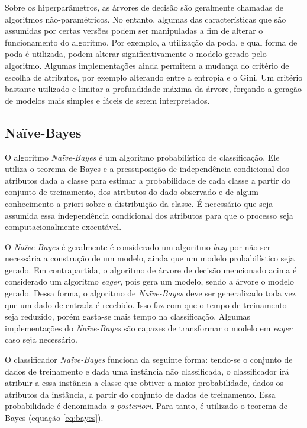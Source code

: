\documentclass{article}
\begin{document}
Sobre os hiperparâmetros, as árvores de decisão são geralmente chamadas de algoritmos não-paramétricos.
No entanto, algumas das características que são assumidas por certas versões podem ser manipuladas
a fim de alterar o funcionamento do algoritmo.
Por exemplo, a utilização da poda, e qual forma de poda é utilizada,
podem alterar significativamente o modelo gerado pelo algoritmo.
Algumas implementações ainda permitem a mudança do critério de escolha de atributos,
por exemplo alterando entre a entropia e o Gini.
Um critério bastante utilizado e limitar a profundidade máxima da árvore,
forçando a geração de modelos mais simples e fáceis de serem interpretados.


\subsection{Naïve-Bayes}

O algoritmo {\it Naïve-Bayes} é um algoritmo probabilístico de classificação.
Ele utiliza o teorema de Bayes e a pressuposição de independência condicional
dos atributos dada a classe para estimar a probabilidade de cada classe a partir do conjunto de treinamento,
dos atributos do dado observado e de algum conhecimento a priori sobre a distribuição da classe.
É necessário que seja assumida essa independência condicional dos atributos para
que o processo seja computacionalmente executável.

O {\it Naïve-Bayes} é geralmente é considerado um algoritmo {\it lazy} por não ser necessária a construção de um modelo,
ainda que um modelo probabilístico seja gerado.
Em contrapartida, o algoritmo de árvore de decisão mencionado acima é considerado um algoritmo {\it eager},
pois gera um modelo, sendo a árvore o modelo gerado.
Dessa forma, o algoritmo de {\it Naïve-Bayes} deve ser generalizado toda vez que um dado de entrada é recebido.
Isso faz com que o tempo de treinamento seja reduzido, porém gasta-se mais tempo na classificação.
Algumas implementações do {\it Naïve-Bayes} são capazes de transformar o modelo em {\it eager}
caso seja necessário.

O classificador {\it Naïve-Bayes} funciona da seguinte forma:
tendo-se o conjunto de dados de treinamento e dada uma instância não classificada,
o classificador irá atribuir a essa instância a classe que obtiver a maior probabilidade,
dados os atributos da instância, a partir do conjunto de dados de treinamento.
Essa probabilidade é denominada {\it a posteriori}.
Para tanto, é utilizado o teorema de Bayes (equação \ref{eq:bayes}).
\end{document}
